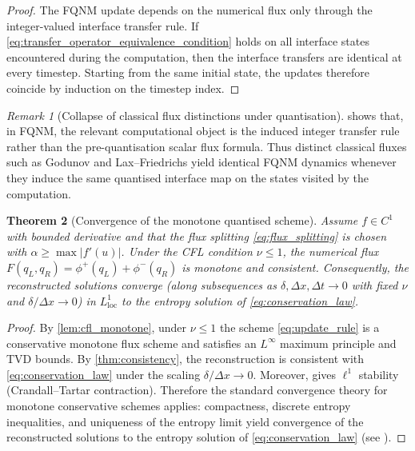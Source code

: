 \documentclass[sn-basic]{sn-jnl}
\theoremstyle{plain}
\newtheorem{theorem}{Theorem}[section]
\theoremstyle{remark}
\newtheorem{remark}[theorem]{Remark}
\begin{document}
\begin{proof}
The FQNM update depends on the numerical flux only through the integer-valued interface transfer rule. If \cref{eq:transfer_operator_equivalence_condition} holds on all interface states encountered during the computation, then the interface transfers are identical at every timestep. Starting from the same initial state, the updates therefore coincide by induction on the timestep index.
\end{proof}

\begin{remark}[Collapse of classical flux distinctions under quantisation]
\label{rem:godunov_lf_collapse}
 shows that, in FQNM, the relevant computational object is the induced integer transfer rule rather than the pre-quantisation scalar flux formula. Thus distinct classical fluxes such as Godunov and Lax--Friedrichs yield identical FQNM dynamics whenever they induce the same quantised interface map on the states visited by the computation.
\end{remark}

%
\begin{theorem}[Convergence of the monotone quantised scheme]
\label{thm:convergence}
Assume $f\in C^1$ with bounded derivative and that the flux splitting
\cref{eq:flux_splitting} is chosen with $\alpha \ge \max|f'(u)|$.
Under the CFL condition $\nu \le 1$, the numerical flux
\(
F(q_L,q_R)=\phi^+(q_L)+\phi^-(q_R)
\)
is monotone and consistent. Consequently, the reconstructed solutions converge (along subsequences as $\delta,\Delta x,\Delta t\to0$ with fixed $\nu$ and $\delta/\Delta x \to 0$) in $L^1_{\mathrm{loc}}$ to the entropy solution of
\cref{eq:conservation_law}.
\end{theorem}

\begin{proof}
By \cref{lem:cfl_monotone}, under \(\nu\le 1\) the scheme \cref{eq:update_rule} is a conservative monotone flux scheme and satisfies an \(L^\infty\) maximum principle and TVD bounds.
By \cref{thm:consistency}, the reconstruction is consistent with \cref{eq:conservation_law} under the scaling $\delta/\Delta x\to0$.
Moreover,  gives \(\ell^1\) stability (Crandall--Tartar contraction). Therefore the standard convergence theory for monotone conservative schemes applies: compactness, discrete entropy inequalities, and uniqueness of the entropy limit yield convergence of the reconstructed solutions to the entropy solution of \cref{eq:conservation_law} (see \cite{hartenHighResolutionSchemes1997,osherHighResolutionSchemes1984,crandallRelationsNonexpansiveOrder1980,toroRiemannSolversNumerical2009,evansPartialDifferentialEquations2010}).
\end{proof}
\end{document}
